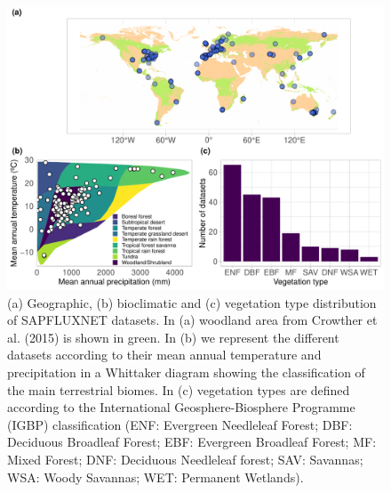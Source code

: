 \documentclass[11pt,twoside]{reedthesis}
\begin{document}
\setlength{\abovecaptionskip}{0pt}
\begin{figure}[H]

{\centering \includegraphics[width=1\linewidth]{figure/CH3/Figure2} 

}

\caption[Geographic, bioclimatic and vegetation type distribution of SAPFLUXNET datasets.]{(a) Geographic, (b) bioclimatic and (c) vegetation type
distribution of SAPFLUXNET datasets. In (a) woodland area from Crowther
et al. (2015) is shown in green. In (b) we represent the different
datasets according to their mean annual temperature and precipitation in
a Whittaker diagram showing the classification of the main terrestrial
biomes. In (c) vegetation types are defined according to the
International Geosphere-Biosphere Programme (IGBP) classification (ENF:
Evergreen Needleleaf Forest; DBF: Deciduous Broadleaf Forest; EBF:
Evergreen Broadleaf Forest; MF: Mixed Forest; DNF: Deciduous Needleleaf
forest; SAV: Savannas; WSA: Woody Savannas; WET: Permanent Wetlands).}\label{fig:Ch2plot2}
\end{figure}
\setlength{\abovecaptionskip}{0pt}
\end{document}

